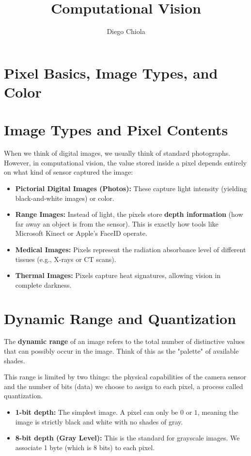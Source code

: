 \documentclass{report}
\title{Computational Vision}
\author{Diego Chiola}
\date{}
\begin{document}
\maketitle

\chapter{Pixel Basics, Image Types, and Color}

\chapter{Image Types and Pixel Contents}
When we think of digital images, we usually think of standard photographs. However, in computational vision, the value stored inside a pixel depends entirely on what kind of sensor captured the image:
\begin{itemize}
    \item \textbf{Pictorial Digital Images (Photos):} These capture light intensity (yielding black-and-white images) or color.
    \item \textbf{Range Images:} Instead of light, the pixels store \textbf{depth information} (how far away an object is from the sensor). This is exactly how tools like Microsoft Kinect or Apple's FaceID operate.
    \item \textbf{Medical Images:} Pixels represent the radiation absorbance level of different tissues (e.g., X-rays or CT scans).
    \item \textbf{Thermal Images:} Pixels capture heat signatures, allowing vision in complete darkness.
\end{itemize}

\chapter{Dynamic Range and Quantization}
The \textbf{dynamic range} of an image refers to the total number of distinctive values that can possibly occur in the image. Think of this as the "palette" of available shades.

This range is limited by two things: the physical capabilities of the camera sensor and the number of bits (data) we choose to assign to each pixel, a process called quantization.
\begin{itemize}
    \item \textbf{1-bit depth:} The simplest image. A pixel can only be $0$ or $1$, meaning the image is strictly black and white with no shades of gray.
    \item \textbf{8-bit depth (Gray Level):} This is the standard for grayscale images. We associate 1 byte (which is 8 bits) to each pixel.
\end{itemize}
\end{document}
